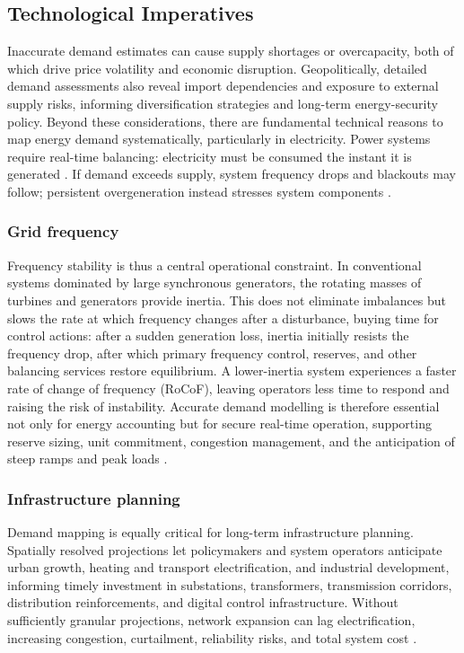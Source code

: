 \subsection{Technological Imperatives}
Inaccurate demand estimates can cause supply shortages or overcapacity, both of which drive price volatility and economic disruption. Geopolitically, detailed demand assessments also reveal import dependencies and exposure to external supply risks, informing diversification strategies and long-term energy-security policy.
\newline Beyond these considerations, there are fundamental technical reasons to map energy demand systematically, particularly in electricity. Power systems require real-time balancing: electricity must be consumed the instant it is generated \cite{WhyDoesElectricity}. If demand exceeds supply, system frequency drops and blackouts may follow; persistent overgeneration instead stresses system components \cite{ElectricalOvervoltageWhat}.

\subsubsection*{Grid frequency}
Frequency stability is thus a central operational constraint. In conventional systems dominated by large synchronous generators, the rotating masses of turbines and generators provide inertia. This does not eliminate imbalances but slows the rate at which frequency changes after a disturbance, buying time for control actions: after a sudden generation loss, inertia initially resists the frequency drop, after which primary frequency control, reserves, and other balancing services restore equilibrium. A lower-inertia system experiences a faster rate of change of frequency (RoCoF), leaving operators less time to respond and raising the risk of instability. Accurate demand modelling is therefore essential not only for energy accounting but for secure real-time operation, supporting reserve sizing, unit commitment, congestion management, and the anticipation of steep ramps and peak loads \cite{denholmInertiaPowerGrid2020}.

\subsubsection*{Infrastructure planning}
Demand mapping is equally critical for long-term infrastructure planning. Spatially resolved projections let policymakers and system operators anticipate urban growth, heating and transport electrification, and industrial development, informing timely investment in substations, transformers, transmission corridors, distribution reinforcements, and digital control infrastructure. Without sufficiently granular projections, network expansion can lag electrification, increasing congestion, curtailment, reliability risks, and total system cost \cite{entsoe_inertia_rocof_2020}.


